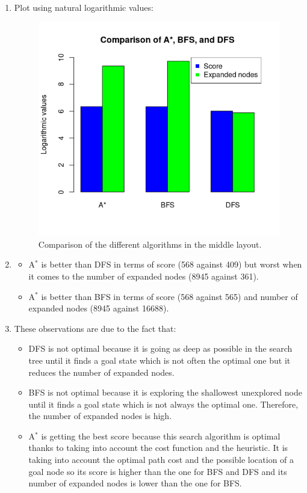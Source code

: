 \documentclass{article}
\begin{document}
\begin{enumerate}[label=\alph*.,leftmargin=1.35em]
    \item Plot using natural logarithmic values:\\
    \begin{figure}[H]
        \centering
        \includegraphics[scale=0.7]{q4_plot.png} 
        \caption{Comparison of the different algorithms in the middle layout.}
    \end{figure}
    \item
        \begin{itemize}
            \item A$^*$ is better than DFS in terms of score (568 against 409) but worst when it comes to the number of expanded nodes (8945 against 361).
            \item A$^*$ is better than BFS in terms of score (568 against 565) and number of expanded nodes (8945 against 16688).
        \end{itemize}
    \item These observations are due to the fact that:
        \begin{itemize}
            \item DFS is not optimal because it is going as deep as possible in the search tree until it finds a goal state which is not often the optimal one but it reduces the number of expanded nodes.
            \item BFS is not optimal because it is exploring the shallowest unexplored node until it finds a goal state which is not always the optimal one. Therefore, the number of expanded nodes is high.
            \item A$^*$ is getting the best score because this search algorithm is optimal thanks to taking into account the cost function and the heuristic. It is taking into account the optimal path cost and the possible location of a goal node so its score is higher than the one for BFS and DFS and its number of expanded nodes is lower than the one for BFS.
        \end{itemize}
\end{enumerate}


\end{document}
